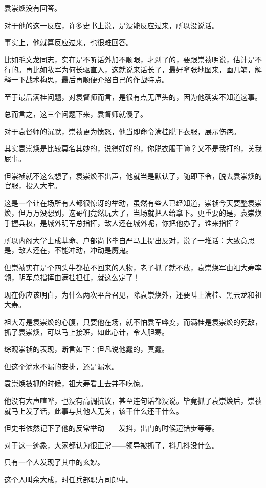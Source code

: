 \begin{multicols}{\theparacolNo}
		袁崇焕没有回答。

		对于他的这一反应，许多史书上说，是没能反应过来，所以没说话。

		事实上，他就算反应过来，也很难回答。

		比如毛文龙同志，实在是不听话外加不顺眼，才剁了的，要跟崇祯明说，估计是不行的。再比如敌军为何长驱直入，这就说来话长了，最好拿张地图来，画几笔，解释一下战术构思，最后再顺便介绍自己的作战特点。

		至于最后满桂问题，对袁督师而言，是很有点无厘头的，因为他确实不知道这事。

		总而言之，这三个问题下来，袁督师就傻了。

		对于袁督师的沉默，崇祯更为愤怒，他当即命令满桂脱下衣服，展示伤疤。

		其实袁崇焕是比较莫名其妙的，说得好好的，你脱衣服干嘛？又不是我打的，关我屁事。

		但崇祯就不这么想了，袁崇焕不出声，他就当是默认了，随即下令，脱去袁崇焕的官服，投入大牢。

		这是一个让在场所有人都很惊讶的举动，虽然有些人已经知道，崇祯今天要整袁崇焕，但万万没想到，这哥们竟然玩大了，当场就把人给拿下。更重要的是，袁崇焕手握兵权，是城外明军总指挥，敌人还在城外呢，你把他办了，谁来指挥？

		所以内阁大学士成基命、户部尚书毕自严马上提出反对，说了一堆话：大致意思是，敌人还在，不能冲动，冲动是魔鬼。

		但崇祯实在是个四头牛都拉不回来的人物，老子抓了就不放，袁崇焕军由祖大寿率领，明军总指挥由满桂担任，就这么定了！

		现在你应该明白，为什么两次平台召见，除袁崇焕外，还要叫上满桂、黑云龙和祖大寿。

		祖大寿是袁崇焕的心腹，只要他在场，就不怕袁军哗变，而满桂是袁崇焕的死敌，抓了袁崇焕，可以马上接班，如此心计，令人胆寒。

		综观崇祯的表现，断言如下：但凡说他蠢的，真蠢。

		但这个滴水不漏的安排，还是漏水。

		袁崇焕被抓的时候，祖大寿看上去并不吃惊。

		他没有大声喧哗，也没有高调抗议，甚至连句话都没说。毕竟抓了袁崇焕后，崇祯就马上发了话，此事与其他人无关，该干什么还干什么。

		但史书依然记下了他的反常举动——发抖，出门的时候迈错步等等。

		对于这一迹象，大家都认为很正常——领导被抓了，抖几抖没什么。

		只有一个人发现了其中的玄妙。

		这个人叫余大成，时任兵部职方司郎中。


\end{multicols}
